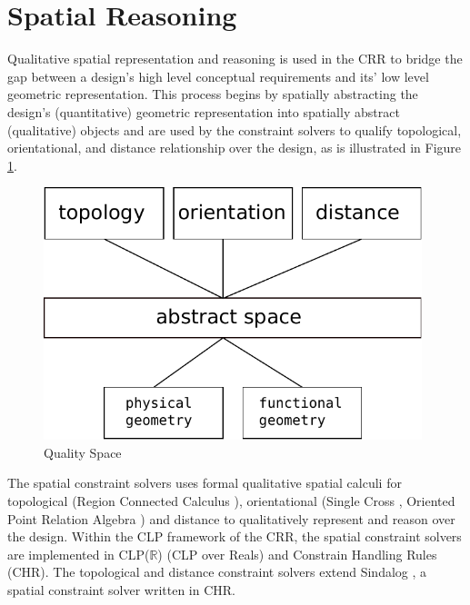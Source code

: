 \documentclass[12pt]{ucthesis}
\begin{document}
\section{Spatial Reasoning}
Qualitative spatial representation and reasoning is used in the CRR to bridge the gap between a design's high level conceptual requirements and its' low level geometric representation. This process begins by spatially abstracting the design's (quantitative) geometric representation into spatially abstract (qualitative) objects and are used by the constraint solvers to qualify topological, orientational, and distance relationship over the design, as is illustrated in Figure \ref{reasoner-design}. 

\begin{figure}[H]
\centering
\includegraphics[width=110mm]{reasoner-design}
\caption{Quality Space}
\label{reasoner-design}
\end{figure}

The spatial constraint solvers uses formal qualitative spatial calculi for topological (Region Connected Calculus \cite{Freksa}), orientational (Single Cross \cite{Freksa}, Oriented Point Relation Algebra \cite{Moratz}) and distance to qualitatively represent and reason over the design. Within the CLP framework of the CRR, the spatial constraint solvers are implemented in CLP($\mathbb{R}$) (CLP over Reals) and Constrain Handling Rules (CHR). The topological and distance constraint solvers extend Sindalog \cite{Sindalog}, a spatial constraint solver written in CHR.
\end{document}
